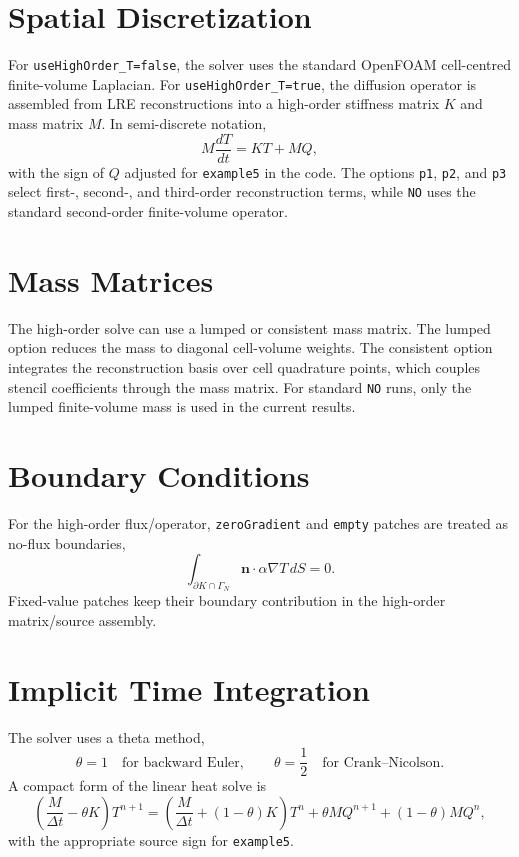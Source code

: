 \documentclass[11pt,a4paper]{article}
\newcommand{\code}[1]{\texttt{#1}}
\begin{document}
\section{Spatial Discretization}
For \code{useHighOrder\_T=false}, the solver uses the standard OpenFOAM cell-centred finite-volume Laplacian. For \code{useHighOrder\_T=true}, the diffusion operator is assembled from LRE reconstructions into a high-order stiffness matrix $K$ and mass matrix $M$. In semi-discrete notation,
\begin{equation}
M\frac{dT}{dt} = K T + M Q,
\end{equation}
with the sign of $Q$ adjusted for \code{example5} in the code. The options \code{p1}, \code{p2}, and \code{p3} select first-, second-, and third-order reconstruction terms, while \code{NO} uses the standard second-order finite-volume operator.
\section{Mass Matrices}
The high-order solve can use a lumped or consistent mass matrix. The lumped option reduces the mass to diagonal cell-volume weights. The consistent option integrates the reconstruction basis over cell quadrature points, which couples stencil coefficients through the mass matrix. For standard \code{NO} runs, only the lumped finite-volume mass is used in the current results.
\section{Boundary Conditions}
For the high-order flux/operator, \code{zeroGradient} and \code{empty} patches are treated as no-flux boundaries,
\begin{equation}
\int_{\partial K\cap\Gamma_N} \mathbf{n}\cdot\alpha\nabla T\,dS=0.
\end{equation}
Fixed-value patches keep their boundary contribution in the high-order matrix/source assembly.
\section{Implicit Time Integration}
The solver uses a theta method,
\begin{equation}
\theta=1\quad\text{for backward Euler},\qquad \theta=\frac12\quad\text{for Crank--Nicolson}.
\end{equation}
A compact form of the linear heat solve is
\begin{equation}
\left(\frac{M}{\Delta t}-\theta K\right)T^{n+1}
=\left(\frac{M}{\Delta t}+(1-\theta)K\right)T^n
+\theta M Q^{n+1}+(1-\theta)M Q^n,
\end{equation}
with the appropriate source sign for \code{example5}.
\end{document}
